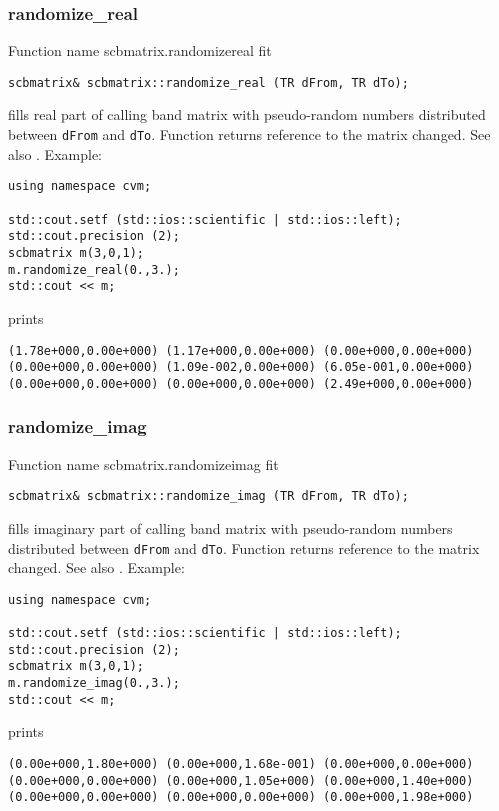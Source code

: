 \subsubsection{randomize\_real}
Function%
\pdfdest name {scbmatrix.randomizereal} fit
\begin{verbatim}
scbmatrix& scbmatrix::randomize_real (TR dFrom, TR dTo);
\end{verbatim}
fills  real part of  calling band matrix with 
pseudo-random numbers distributed between
\verb"dFrom" and \verb"dTo".
Function
returns  reference to the matrix changed.
See also
.
Example:
\begin{Verbatim}
using namespace cvm;

std::cout.setf (std::ios::scientific | std::ios::left); 
std::cout.precision (2);
scbmatrix m(3,0,1);
m.randomize_real(0.,3.);
std::cout << m;
\end{Verbatim}
prints
\begin{Verbatim}
(1.78e+000,0.00e+000) (1.17e+000,0.00e+000) (0.00e+000,0.00e+000)
(0.00e+000,0.00e+000) (1.09e-002,0.00e+000) (6.05e-001,0.00e+000)
(0.00e+000,0.00e+000) (0.00e+000,0.00e+000) (2.49e+000,0.00e+000)
\end{Verbatim}
\newpage


\subsubsection{randomize\_imag}
Function%
\pdfdest name {scbmatrix.randomizeimag} fit
\begin{verbatim}
scbmatrix& scbmatrix::randomize_imag (TR dFrom, TR dTo);
\end{verbatim}
fills  imaginary part of  calling band matrix with 
pseudo-random numbers distributed between
\verb"dFrom" and \verb"dTo".
Function
returns  reference to the matrix changed.
See also
.
Example:
\begin{Verbatim}
using namespace cvm;

std::cout.setf (std::ios::scientific | std::ios::left);
std::cout.precision (2);
scbmatrix m(3,0,1);
m.randomize_imag(0.,3.);
std::cout << m;
\end{Verbatim}
prints
\begin{Verbatim}
(0.00e+000,1.80e+000) (0.00e+000,1.68e-001) (0.00e+000,0.00e+000)
(0.00e+000,0.00e+000) (0.00e+000,1.05e+000) (0.00e+000,1.40e+000)
(0.00e+000,0.00e+000) (0.00e+000,0.00e+000) (0.00e+000,1.98e+000)
\end{Verbatim}
\newpage


